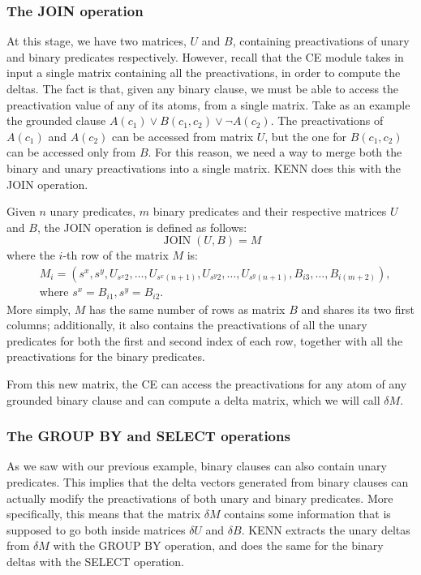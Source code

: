 \subsubsection{The JOIN operation}
At this stage, we have two matrices, $U$ and $B$, containing preactivations of unary and binary predicates respectively. However, recall that the CE module takes in input a single matrix containing all the preactivations, in order to compute the deltas. The fact is that, given any binary clause, we must be able to access the preactivation value of any of its atoms, from a single matrix. Take as an example the grounded clause $A(c_1) \vee B(c_1,c_2) \vee \neg A(c_2)$. The preactivations of $A(c_1)$ and $ A(c_2)$ can be accessed from matrix $U$, but the one for $B(c_1, c_2)$ can be accessed only from $B$.
For this reason, we need a way to merge both the binary and unary preactivations into a single matrix. KENN does this with the JOIN operation. 
\begin{definition}[JOIN]
	Given $n$ unary predicates, $m$ binary predicates and their respective matrices $U$ and $B$, the JOIN operation is defined as follows:
	\begin{equation*}
	\operatorname{JOIN}(U,B) = M
	\end{equation*}
	where the $i$-th row of the matrix $M$ is:
	\begin{equation*}
	\begin{align*}
	&M_{i} = (s^x,s^y, U_{s^x2}, \dots, U_{s^x(n+1)}, U_{s^y2}, \dots, U_{s^y(n+1)},B_{i3},\dots, B_{i(m+2)}),\\
	&\text{where   } s^x = B_{i1}, s^y = B_{i2}.
	\end{align*}
	\end{equation*}
More simply, $M$ has the same number of rows as matrix $B$ and shares its two first columns; additionally, it also contains the preactivations of all the unary predicates for both the first and second index of each row, together with all the preactivations for the binary predicates. 
\end{definition}

From this new matrix, the CE can access the preactivations for any atom of any grounded binary clause and can compute a delta matrix, which we will call $\delta M$.


\subsubsection{The GROUP BY and SELECT operations}
As we saw with our previous example, binary clauses can also contain unary predicates. This implies that the delta vectors generated from binary clauses can actually modify the preactivations of both unary and binary predicates. More specifically, this means that the matrix $\delta M$ contains some information that is supposed to go both inside matrices $\delta U$ and $\delta B$. KENN extracts the unary deltas from $\delta M$ with the GROUP BY operation, and does the same for the binary deltas with the SELECT operation.

